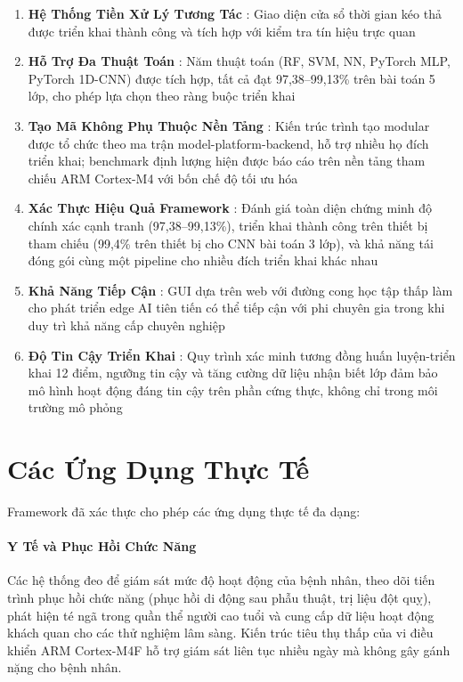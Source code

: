 \begin{enumerate}
    \item \textbf{Hệ Thống Tiền Xử Lý Tương Tác} \checkmark: Giao diện cửa sổ thời gian kéo thả được triển khai thành công và tích hợp với kiểm tra tín hiệu trực quan

    \item \textbf{Hỗ Trợ Đa Thuật Toán} \checkmark: Năm thuật toán (RF, SVM, NN, PyTorch MLP, PyTorch 1D-CNN) được tích hợp, tất cả đạt 97,38--99,13\% trên bài toán 5 lớp, cho phép lựa chọn theo ràng buộc triển khai

    \item \textbf{Tạo Mã Không Phụ Thuộc Nền Tảng} \checkmark: Kiến trúc trình tạo modular được tổ chức theo ma trận model-platform-backend, hỗ trợ nhiều họ đích triển khai; benchmark định lượng hiện được báo cáo trên nền tảng tham chiếu ARM Cortex-M4 với bốn chế độ tối ưu hóa

    \item \textbf{Xác Thực Hiệu Quả Framework} \checkmark: Đánh giá toàn diện chứng minh độ chính xác cạnh tranh (97,38--99,13\%), triển khai thành công trên thiết bị tham chiếu (99,4\% trên thiết bị cho CNN bài toán 3 lớp), và khả năng tái đóng gói cùng một pipeline cho nhiều đích triển khai khác nhau

    \item \textbf{Khả Năng Tiếp Cận} \checkmark: GUI dựa trên web với đường cong học tập thấp làm cho phát triển edge AI tiên tiến có thể tiếp cận với phi chuyên gia trong khi duy trì khả năng cấp chuyên nghiệp

    \item \textbf{Độ Tin Cậy Triển Khai} \checkmark: Quy trình xác minh tương đồng huấn luyện-triển khai 12 điểm, ngưỡng tin cậy và tăng cường dữ liệu nhận biết lớp đảm bảo mô hình hoạt động đáng tin cậy trên phần cứng thực, không chỉ trong môi trường mô phỏng
\end{enumerate}

\section{Các Ứng Dụng Thực Tế}

Framework đã xác thực cho phép các ứng dụng thực tế đa dạng:

\paragraph{Y Tế và Phục Hồi Chức Năng}
Các hệ thống đeo để giám sát mức độ hoạt động của bệnh nhân, theo dõi tiến trình phục hồi chức năng (phục hồi di động sau phẫu thuật, trị liệu đột quỵ), phát hiện té ngã trong quần thể người cao tuổi và cung cấp dữ liệu hoạt động khách quan cho các thử nghiệm lâm sàng. Kiến trúc tiêu thụ thấp của vi điều khiển ARM Cortex-M4F hỗ trợ giám sát liên tục nhiều ngày mà không gây gánh nặng cho bệnh nhân.


